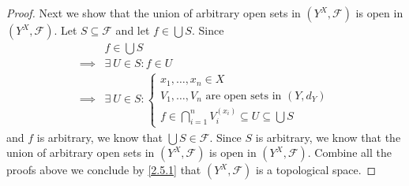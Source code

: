 \begin{proof}
  Next we show that the union of arbitrary open sets in \((Y^X, \mathcal{F})\) is open in \((Y^X, \mathcal{F})\).
  Let \(S \subseteq \mathcal{F}\) and let \(f \in \bigcup S\).
  Since
  \begin{align*}
             & f \in \bigcup S                                                                       \\
    \implies & \exists\ U \in S : f \in U                                                            \\
    \implies & \exists\ U \in S : \begin{cases}
                                    x_1, \dots, x_n \in X                              \\
                                    V_1, \dots, V_n \text{ are open sets in } (Y, d_Y) \\
                                    f \in \bigcap_{i = 1}^n V_i^{(x_i)} \subseteq U \subseteq \bigcup S
                                  \end{cases}
  \end{align*}
  and \(f\) is arbitrary, we know that \(\bigcup S \in \mathcal{F}\).
  Since \(S\) is arbitrary, we know that the union of arbitrary open sets in \((Y^X, \mathcal{F})\) is open in \((Y^X, \mathcal{F})\).
  Combine all the proofs above we conclude by \cref{2.5.1} that \((Y^X, \mathcal{F})\) is a topological space.


\end{proof}

